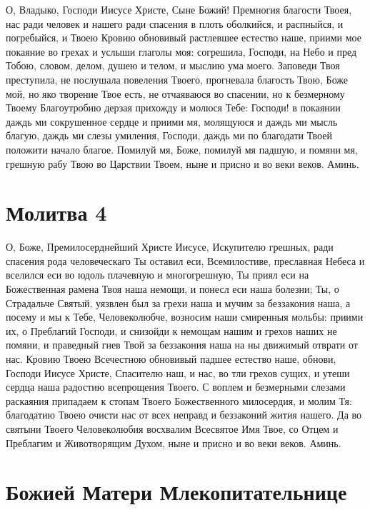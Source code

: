 О, Владыко, Господи Иисусе Христе, Сыне Божий! Премногия благости Твоея, нас ради человек и нашего ради спасения в плоть оболкийся, и распныйся, и погребыйся, и Твоею Кровию обновивый растлевшее естество наше, приими мое покаяние во грехах и услыши глаголы моя: согрешила, Господи, на Небо и пред Тобою, словом, делом, душею и телом, и мыслию ума моего. Заповеди Твоя преступила, не послушала повеления Твоего, прогневала благость Твою, Боже мой, но яко творение Твое есть, не отчаяваюся во спасении, но к безмерному Твоему Благоутробию дерзая прихожду и молюся Тебе: Господи! в покаянии даждь ми сокрушенное сердце и приими мя, молящуюся и даждь ми мысль благую, даждь ми слезы умиления, Господи, даждь ми по благодати Твоей положити начало благое. Помилуй мя, Боже, помилуй мя падшую, и помяни мя, грешную рабу Твою во Царствии Твоем, ныне и присно и во веки веков. Аминь.

\section{Молитва 4}
 


О, Боже, Премилосерднейший Христе Иисусе, Искупителю грешных, ради спасения рода человеческаго Ты оставил еси, Всемилостиве, преславная Небеса и вселился еси во юдоль плачевную и многогрешную, Ты приял еси на Божественная рамена Твоя наша немощи, и понесл еси наша болезни; Ты, о Страдальче Святый, уязвлен был за грехи наша и мучим за беззакония наша, а посему и мы к Тебе, Человеколюбче, возносим наши смиренныя мольбы: приими их, о Преблагий Господи, и снизойди к немощам нашим и грехов наших не помяни, и праведный гнев Твой за беззакония наша на ны движимый отврати от нас. Кровию Твоею Всечестною обновивый падшее естество наше, обнови, Господи Иисусе Христе, Спасителю наш, и нас, во тли грехов сущих, и утеши сердца наша радостию всепрощения Твоего. С воплем и безмерными слезами раскаяния припадаем к стопам Твоего Божественного милосердия, и молим Тя: благодатию Твоею очисти нас от всех неправд и беззаконий жития нашего. Да во святыни Твоего Человеколюбия восхвалим Всесвятое Имя Твое, со Отцем и Преблагим и Животворящим Духом, ныне и присно и во веки веков. Аминь.\mychapterending


 

\section{Божией Матери Млекопитательнице}
 
